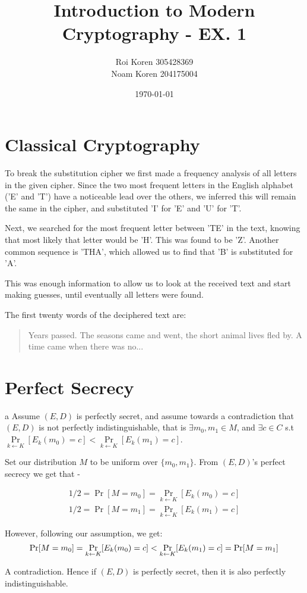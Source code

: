 \documentclass{article}
\begin{document}
\title{Introduction to Modern Cryptography - EX. 1}
\author{Roi Koren 305428369\\ Noam Koren 204175004}
\date{\today}
\maketitle
\newpage
{}

\section{Classical Cryptography}

To break the substitution cipher we first made a frequency analysis of all letters in the given cipher.
Since the two most frequent letters in the English alphabet ('E' and 'T') have a noticeable lead over the others,
we inferred this will remain the same in the cipher, and substituted 'I' for 'E' and 'U' for 'T'.

Next, we searched for the most frequent letter between 'TE' in the text, knowing that most likely that letter
would be 'H'. This was found to be 'Z'. Another common sequence is 'THA', which allowed us to find that 'B'
is substituted for 'A'.

This was enough information to allow us to look at the received text and start making guesses, until eventually
all letters were found.

The first twenty words of the deciphered text are:
\begin{quotation}
	Years passed. The seasons came and went, the short animal lives fled by. A time came when there was no...
\end{quotation}

\section{Perfect Secrecy}
\begin{paragraph}
	a Assume $(E,D)$ is perfectly secret, and assume towards a contradiction that $(E,D)$ is not perfectly indistinguishable, that is $\exists m_0, m_1 \in M$, and $\exists c \in C$ s.t
	$\Pr\limits_{k \leftarrow K}[E_k(m_0) = c] < \Pr\limits_{k \leftarrow K}[E_k(m_1) = c]$.

	Set our distribution $M$ to be uniform over ${\{m_0, m_1\}}$. From $(E,D)$'s perfect secrecy we get that -

	\begin{gather*}
		1/2 = \Pr[M = m_0] = \Pr\limits_{k \leftarrow K}[E_k(m_0) = c] \\
		1/2 = \Pr[M = m_1] = \Pr\limits_{k \leftarrow K}[E_k(m_1) = c]
	\end{gather*}

	However, following our assumption, we get:
	\begin{equation*}
		\Pr[M = m_0] = \Pr\limits_{k \leftarrow K}[E_k(m_0) = c] < \Pr\limits_{k \leftarrow K}[E_k(m_1) = c] = \Pr[M = m_1]\\
	\end{equation*}

	A contradiction. Hence if $(E,D)$ is perfectly secret, then it is also perfectly indistinguishable.
\end{paragraph}
\end{document}
